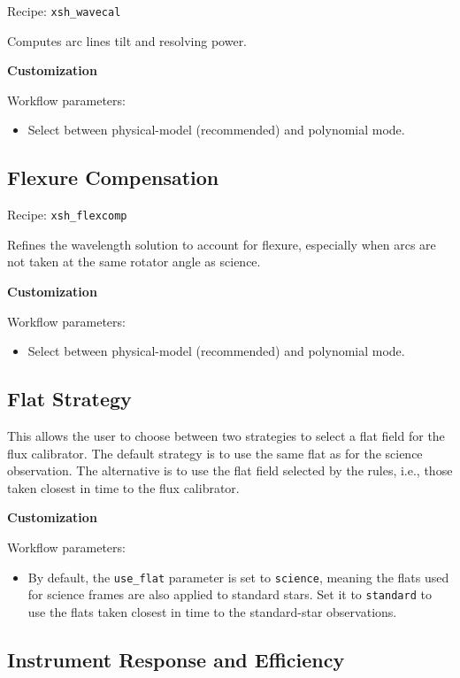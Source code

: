 Recipe: {\tt xsh\_wavecal}

Computes arc lines tilt and resolving power.

\bigskip
{\bf Customization}
\bigskip

Workflow parameters:
\begin{itemize}
\item Select between physical-model (recommended) and polynomial mode.
\end{itemize}

\subsection{Flexure Compensation}

Recipe: {\tt xsh\_flexcomp}

Refines the wavelength solution to account for flexure, 
especially when arcs are not taken at the same rotator angle as science.

\bigskip
{\bf Customization}
\bigskip

Workflow parameters:
\begin{itemize}
\item Select between physical-model (recommended) and polynomial mode.
\end{itemize}

\subsection{Flat Strategy}

This allows the user to choose between two strategies 
to select a flat field for the flux calibrator.
The default strategy is to use the same flat as for the science observation.
The alternative is to use the flat field selected by the rules, 
i.e., those taken closest in time to the flux calibrator.

\bigskip
{\bf Customization}
\bigskip

Workflow parameters:
\begin{itemize}
\item By default, the {\tt use\_flat} parameter is set to {\tt science}, 
meaning the flats used for science frames are also applied to standard stars.
Set it to {\tt standard} to use the flats taken closest in time 
to the standard-star observations.
\end{itemize}

\subsection{Instrument Response and Efficiency}

